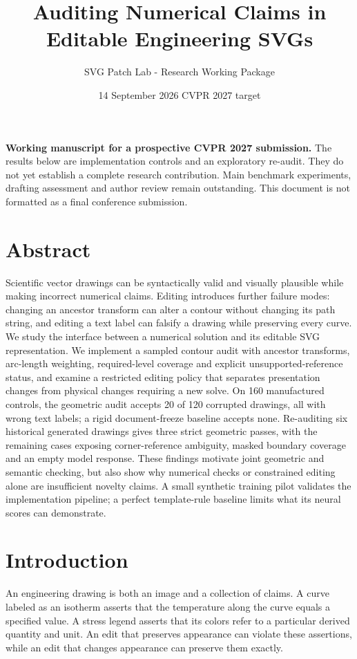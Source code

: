 \documentclass[
  11pt,
  a4paper,
]{article}
\title{Auditing Numerical Claims in Editable Engineering SVGs}
\author{SVG Patch Lab - Research Working Package}
\date{14 September 2026 \textbar{} CVPR 2027 target}
\newcounter{none} %
\let\originaltableofcontents\tableofcontents
\renewcommand{\tableofcontents}{\originaltableofcontents\clearpage}
\begin{document}
\maketitle

{
\setcounter{tocdepth}{2}
\tableofcontents
}
\textbf{Working manuscript for a prospective CVPR 2027 submission.} The
results below are implementation controls and an exploratory re-audit.
They do not yet establish a complete research contribution. Main
benchmark experiments, drafting assessment and author review remain
outstanding. This document is not formatted as a final conference
submission.

\section{Abstract}\label{abstract}

Scientific vector drawings can be syntactically valid and visually
plausible while making incorrect numerical claims. Editing introduces
further failure modes: changing an ancestor transform can alter a
contour without changing its path string, and editing a text label can
falsify a drawing while preserving every curve. We study the interface
between a numerical solution and its editable SVG representation. We
implement a sampled contour audit with ancestor transforms, arc-length
weighting, required-level coverage and explicit unsupported-reference
status, and examine a restricted editing policy that separates
presentation changes from physical changes requiring a new solve. On 160
manufactured controls, the geometric audit accepts 20 of 120 corrupted
drawings, all with wrong text labels; a rigid document-freeze baseline
accepts none. Re-auditing six historical generated drawings gives three
strict geometric passes, with the remaining cases exposing
corner-reference ambiguity, masked boundary coverage and an empty model
response. These findings motivate joint geometric and semantic checking,
but also show why numerical checks or constrained editing alone are
insufficient novelty claims. A small synthetic training pilot validates
the implementation pipeline; a perfect template-rule baseline limits
what its neural scores can demonstrate.

\section{Introduction}\label{introduction}

An engineering drawing is both an image and a collection of claims. A
curve labeled as an isotherm asserts that the temperature along the
curve equals a specified value. A stress legend asserts that its colors
refer to a particular derived quantity and unit. An edit that preserves
appearance can violate these assertions, while an edit that changes
appearance can preserve them exactly.
\end{document}

